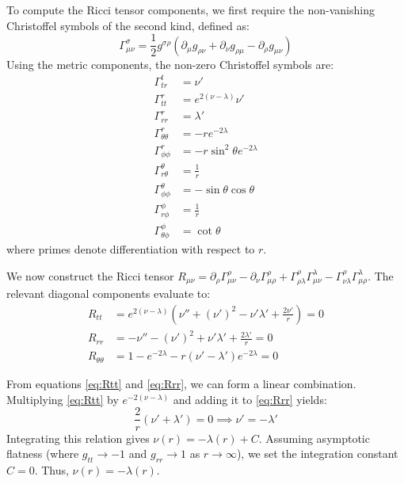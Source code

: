 To compute the Ricci tensor components, we first require the non-vanishing Christoffel symbols of the second kind, defined as:
\begin{equation}
\Gamma^\sigma_{\mu\nu} = \frac{1}{2} g^{\sigma\rho} \left( \partial_\mu g_{\rho\nu} + \partial_\nu g_{\rho\mu} - \partial_\rho g_{\mu\nu} \right)
\end{equation}
Using the metric components, the non-zero Christoffel symbols are:
\begin{align}
\Gamma^t_{tr} &= \nu' \\
\Gamma^r_{tt} &= e^{2(\nu - \lambda)} \nu' \\
\Gamma^r_{rr} &= \lambda' \\
\Gamma^r_{\theta\theta} &= -r e^{-2\lambda} \\
\Gamma^r_{\phi\phi} &= -r \sin^2\theta e^{-2\lambda} \\
\Gamma^\theta_{r\theta} &= \frac{1}{r} \\
\Gamma^\theta_{\phi\phi} &= -\sin\theta \cos\theta \\
\Gamma^\phi_{r\phi} &= \frac{1}{r} \\
\Gamma^\phi_{\theta\phi} &= \cot\theta
\end{align}
where primes denote differentiation with respect to $r$. 

We now construct the Ricci tensor $R_{\mu\nu} = \partial_\rho \Gamma^\rho_{\mu\nu} - \partial_\nu \Gamma^\rho_{\mu\rho} + \Gamma^\rho_{\rho\lambda}\Gamma^\lambda_{\mu\nu} - \Gamma^\rho_{\nu\lambda}\Gamma^\lambda_{\mu\rho}$. The relevant diagonal components evaluate to:
\begin{align}
R_{tt} &= e^{2(\nu-\lambda)} \left( \nu'' + (\nu')^2 - \nu'\lambda' + \frac{2\nu'}{r} \right) = 0 \label{eq:Rtt} \\
R_{rr} &= -\nu'' - (\nu')^2 + \nu'\lambda' + \frac{2\lambda'}{r} = 0 \label{eq:Rrr} \\
R_{\theta\theta} &= 1 - e^{-2\lambda} - r(\nu' - \lambda')e^{-2\lambda} = 0 \label{eq:Rtheta}
\end{align}

From equations \eqref{eq:Rtt} and \eqref{eq:Rrr}, we can form a linear combination. Multiplying \eqref{eq:Rtt} by $e^{-2(\nu-\lambda)}$ and adding it to \eqref{eq:Rrr} yields:
\begin{equation}
\frac{2}{r}(\nu' + \lambda') = 0 \implies \nu' = -\lambda'
\end{equation}
Integrating this relation gives $\nu(r) = -\lambda(r) + C$. Assuming asymptotic flatness (where $g_{tt} \to -1$ and $g_{rr} \to 1$ as $r \to \infty$), we set the integration constant $C = 0$. Thus, $\nu(r) = -\lambda(r)$.

